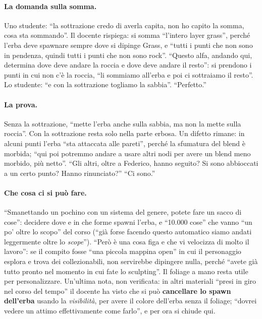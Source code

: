 \paragraph{La domanda sulla somma.} Uno studente: ``la sottrazione credo di averla capita, non
ho capito la somma, cosa sta sommando''. Il docente rispiega: si somma ``l'intero layer
grass'', perché l'erba deve spawnare sempre dove si dipinge Grass, e ``tutti i punti che non
sono in pendenza, quindi tutti i punti che non sono rock''. ``Questo alfa, andando qui,
determina dove deve andare la roccia e dove deve andare il resto'': si prendono i punti in cui
non c'è la roccia, ``li sommiamo all'erba e poi ci sottraiamo il resto''. Lo studente: ``e con
la sottrazione togliamo la sabbia''. ``Perfetto.''

\paragraph{La prova.} Senza la sottrazione, ``mette l'erba anche sulla sabbia, ma non la mette
sulla roccia''. Con la sottrazione resta solo nella parte erbosa. Un difetto rimane: in
alcuni punti l'erba ``sta attaccata alle pareti'', perché la sfumatura del blend è morbida;
``qui poi potremmo andare a usare altri nodi per avere un blend meno morbido, più netto''.
``Gli altri, oltre a Federico, hanno seguito? Si sono abbioccati a un certo punto? Hanno
rinunciato?'' ``Ci sono.''

\paragraph{Che cosa ci si può fare.} ``Smanettando un pochino con un sistema del genere,
potete fare un sacco di cose'': decidere dove e in che forme spawni l'erba, e ``10.000 cose''
che vanno ``un po' oltre lo scopo'' del corso (``già forse facendo questo automatico siamo
andati leggermente oltre lo \emph{scope}''). ``Però è una cosa figa e che vi velocizza di
molto il lavoro'': se il compito fosse ``una piccola mappina open'' in cui il personaggio
esplora e trova dei collezionabili, non servirebbe dipingere nulla, perché ``avete già tutto
pronto nel momento in cui fate lo sculpting''. Il foliage a mano resta utile per
personalizzare. Un'ultima nota, non verificata: in altri materiali ``presi in giro nel corso
del tempo'' il docente ha visto che si può \textbf{cancellare lo spawn dell'erba} usando la
\emph{visibilità}, per avere il colore dell'erba senza il foliage; ``dovrei vedere un attimo
effettivamente come farlo'', e per ora si chiude qui.


